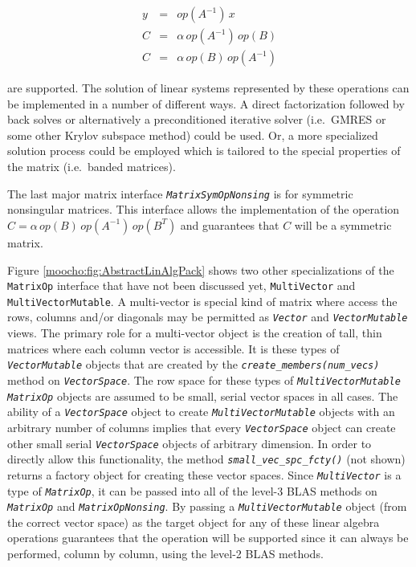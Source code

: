 \documentclass[pdf,12pt,report]{SANDreport}
\begin{document}
{\bsinglespace
\begin{eqnarray*}
y & = & op(A^{-1}) \, x \\
C & = & \alpha \, op(A^{-1}) \, op(B) \\
C & = & \alpha \, op(B) \, op(A^{-1})
\end{eqnarray*}
\esinglespace}

\noindent{}are supported.  The solution of linear systems represented by these
operations can be implemented in a number of different ways.  A direct
factorization followed by back solves or alternatively a preconditioned
iterative solver (i.e.\ GMRES or some other Krylov subspace method) could be
used.  Or, a more specialized solution process could be employed which is
tailored to the special properties of the matrix (i.e.\ banded matrices).

The last major matrix interface
{}\texttt{\textit{Matrix\-Sym\-Op\-Nonsing}} is for symmetric
nonsingular matrices.  This interface allows the implementation of the
operation $C = \alpha\,op(B)\,op(A^{-1})\,op(B^T)$ and guarantees
that $C$ will be a symmetric matrix.

Figure {}\ref{moocho:fig:AbstractLinAlgPack} shows two other specializations
of the {}\texttt{Matrix\-Op} interface that have not been discussed yet,
{}\texttt{Multi\-Vector} and {}\texttt{Multi\-Vector\-Mutable}.  A
multi-vector is special kind of matrix where access the rows, columns and/or
diagonals may be permitted as {}\texttt{\textit{Vector}} and
{}\texttt{\textit{Vector\-Mutable}} views.  The primary role for a
multi-vector object is the creation of tall, thin matrices where each column
vector is accessible.  It is these types of
{}\texttt{\textit{Vector\-Mutable}} objects that are created by the
{}\texttt{\textit{create\_members(num\_vecs)}} method on
{}\texttt{\textit{Vector\-Space}}.  The row space for these types of
{}\texttt{\textit{Multi\-Vector\-Mutable}} {}\texttt{\textit{Matrix\-Op}}
objects are assumed to be small, serial vector spaces in all cases.  The
ability of a {}\texttt{\textit{Vector\-Space}} object to create
{}\texttt{\textit{Multi\-Vector\-Mutable}} objects with an arbitrary number of
columns implies that every {}\texttt{\textit{Vector\-Space}} object can create
other small serial {}\texttt{\textit{Vector\-Space}} objects of arbitrary
dimension.  In order to directly allow this functionality, the method
{}\texttt{\textit{small\_vec\_spc\_fcty()}} (not shown) returns a factory
object for creating these vector spaces.  Since
{}\texttt{\textit{Multi\-Vector}} is a type of {}\texttt{\textit{Matrix\-Op}},
it can be passed into all of the level-3 BLAS methods on
{}\texttt{\textit{Matrix\-Op}} and {}\texttt{\textit{Matrix\-Op\-Nonsing}}.
By passing a {}\texttt{\textit{Multi\-Vector\-Mutable}} object (from the
correct vector space) as the target object for any of these linear algebra
operations guarantees that the operation will be supported since it can always
be performed, column by column, using the level-2 BLAS methods.
\end{document}
